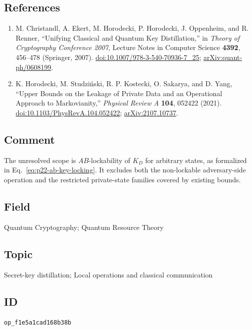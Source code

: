 \subsection*{References}

\begin{enumerate}[label={},leftmargin=4.8em,labelsep=0.5em]
  \footnotesize
  \item[\textup{[CEH+07]}]\label{ref:p22-unifying-key}
  M. Christandl, A. Ekert, M. Horodecki, P. Horodecki, J. Oppenheim, and
  R. Renner, ``Unifying Classical and Quantum Key Distillation,'' in
  \emph{Theory of Cryptography Conference 2007}, Lecture Notes in Computer
  Science \textbf{4392}, 456--478 (Springer, 2007).
  \href{https://doi.org/10.1007/978-3-540-70936-7_25}{doi:10.1007/978-3-540-70936-7\_25};
  \href{https://arxiv.org/abs/quant-ph/0608199}{arXiv:quant-ph/0608199}.

  \item[\textup{[HSK+21]}]\label{ref:p22-private-leakage}
  K. Horodecki, M. Studziński, R. P. Kostecki, O. Sakarya, and D. Yang,
  ``Upper Bounds on the Leakage of Private Data and an Operational Approach
  to Markovianity,'' \emph{Physical Review A} \textbf{104}, 052422 (2021).
  \href{https://doi.org/10.1103/PhysRevA.104.052422}{doi:10.1103/PhysRevA.104.052422};
  \href{https://arxiv.org/abs/2107.10737}{arXiv:2107.10737}.
\end{enumerate}

\subsection*{Comment}

The unresolved scope is $AB$-lockability of $K_D$ for arbitrary states, as
formalized in Eq.~\eqref{eq:p22-ab-key-locking}.  It excludes both the
non-lockable adversary-side operation and the restricted private-state
families covered by existing bounds.

\subsection*{Field}

Quantum Cryptography; Quantum Resource Theory

\subsection*{Topic}

Secret-key distillation; Local operations and classical communication

\subsection*{ID}

\texttt{op\_f1e5a1cad168b38b}
